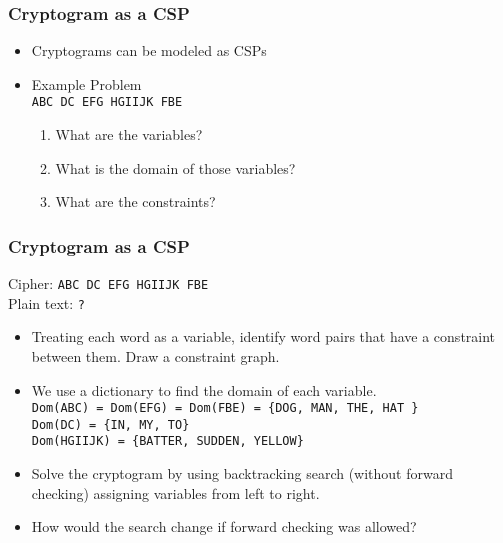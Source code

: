 \documentclass[compress, 9pt]{beamer}
\begin{document}
\begin{frame}
\frametitle{Cryptogram as a CSP}
\label{sec-1-2}
\begin{itemize}

\item <1-> Cryptograms can be modeled as CSPs
\label{sec-1-2-1}%

\item <2-> Example Problem\\
\label{sec-1-2-2}%
\texttt{ABC DC EFG HGIIJK FBE}


\begin{enumerate}
\item What are the variables?
\item What is the domain of those variables?
\item What are the constraints?
\end{enumerate}
\end{itemize} %
\end{frame}
\begin{frame}
\frametitle{Cryptogram as a CSP}
\label{sec-1-3}

Cipher: \texttt{ABC DC EFG HGIIJK FBE}\\
Plain text: \texttt{?}

\begin{itemize}
\item <1-> Treating each word as a variable, identify word pairs that have a constraint between them. Draw a constraint graph.
\item <2->  We use a dictionary to find the domain of each variable. \\
\texttt{Dom(ABC) = Dom(EFG) = Dom(FBE) = \{DOG, MAN, THE, HAT \}}\\
  \texttt{Dom(DC) = \{IN, MY, TO\}}\\
  \texttt{Dom(HGIIJK) = \{BATTER, SUDDEN, YELLOW\}}\\
\item <3-> Solve the cryptogram by using backtracking search (without forward checking) assigning variables from left to right.
\item <4->  How would the search change if forward checking was allowed?
\end{itemize}
\end{frame}
\end{document}
